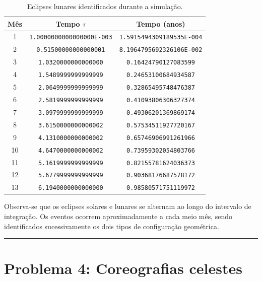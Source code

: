 \documentclass[12pt,a4paper]{article}
\begin{document}
\begin{table}[htbp]
    \centering
    \caption{Eclipses lunares identificados durante a simulação.}
    \label{tab:eclipses-lunares}
    \scriptsize
    \begin{tabular}{c c c}
        \hline
        Mês & Tempo $\tau$ & Tempo (anos) \\
        \hline
        1 & \texttt{1.0000000000000000E-003} & \texttt{1.5915494309189535E-004} \\
        2 & \texttt{0.51500000000000001} & \texttt{8.1964795692326106E-002} \\
        3 & \texttt{1.0320000000000000} & \texttt{0.16424790127083599} \\
        4 & \texttt{1.5489999999999999} & \texttt{0.24653100684934587} \\
        5 & \texttt{2.0649999999999999} & \texttt{0.32865495748476387} \\
        6 & \texttt{2.5819999999999999} & \texttt{0.41093806306327374} \\
        7 & \texttt{3.0979999999999999} & \texttt{0.49306201369869174} \\
        8 & \texttt{3.6150000000000002} & \texttt{0.57534511927720167} \\
        9 & \texttt{4.1310000000000002} & \texttt{0.65746906991261966} \\
        10 & \texttt{4.6470000000000002} & \texttt{0.73959302054803766} \\
        11 & \texttt{5.1619999999999999} & \texttt{0.82155781624036373} \\
        12 & \texttt{5.6779999999999999} & \texttt{0.90368176687578172} \\
        13 & \texttt{6.1940000000000000} & \texttt{0.98580571751119972} \\
        \hline
    \end{tabular}
\end{table}

Observa-se que os eclipses solares e lunares se alternam ao longo do intervalo de integração. Os eventos ocorrem aproximadamente a cada meio mês, sendo identificados sucessivamente os dois tipos de configuração geométrica.

\vspace{0.5cm}
\hrule
\vspace{0.5cm}

\section{Problema 4: Coreografias celestes}
\end{document}
